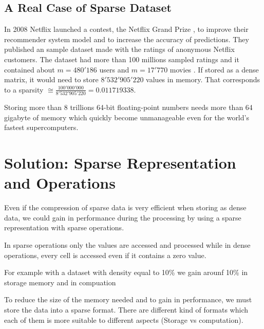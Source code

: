 \subsection{A Real Case of Sparse Dataset}
In 2008 Netflix launched a contest, the Netflix Grand Prize \cite{netflixgrandprize}, to improve their recommender system model and to increase the accuracy of predictions. They published an sample dataset made with the ratings of anonymous Netflix customers. The dataset had more than 100 millions sampled ratings and it contained about $m=480'186$ users and $m=17'770$ movies \cite{Koren091the}. If stored as a dense matrix, it would need to store $8'532'905'220$ values in memory. That corresponds to a sparsity $\cong \frac{100'000'000}{8'532'905'220} = 0.011719338$.

Storing more than 8 trillions 64-bit floating-point numbers needs more than 64 gigabyte of memory which quickly become unmanageable even for the world's fastest supercomputers. 

\section{Solution: Sparse Representation and Operations}
Even if the compression of sparse data is very efficient when storing as dense data, we could gain in performance during the processing by using a sparse representation with sparse operations. 

In sparse operations only the values are accessed and processed while in dense operations, every cell is accessed even if it contains a zero value.

For example with a dataset with density equal to 10\% we gain arounf 10\% in storage memory and in compuation %

To reduce the size of the memory needed and to gain in performance, we must store the data into a sparse format. There are different kind of formats which each of them is more suitable to different aspects (Storage vs computation).




